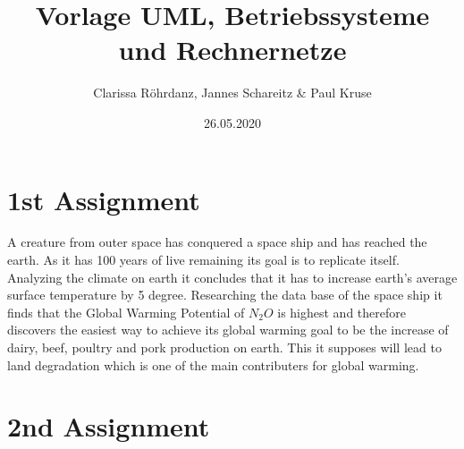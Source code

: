 \documentclass{Gharaei}
\title{Vorlage UML, Betriebssysteme und Rechnernetze}
\author{Clarissa Röhrdanz, Jannes Schareitz \& Paul Kruse}
\date{26.05.2020}
\begin{document}
\maketitle
\newpage
\thispagestyle{empty}
\tableofcontents
\setcounter{page}{1}
\newpage
\section{1st Assignment}
A creature from outer space has conquered a space ship and has reached the earth. As it has 100 years of live remaining its goal is to replicate itself. Analyzing the climate on earth it concludes that it has to increase earth's average surface temperature by 5 degree. Researching the data base of the space ship it finds that the Global Warming Potential of $N_{2}O$ is highest and therefore discovers the easiest way to achieve its global warming goal to be the increase of dairy, beef, poultry and pork production on earth. This it supposes will lead to land degradation which is one of the main contributers for global warming. %
\newpage
\section{2nd Assignment}
\end{document}
